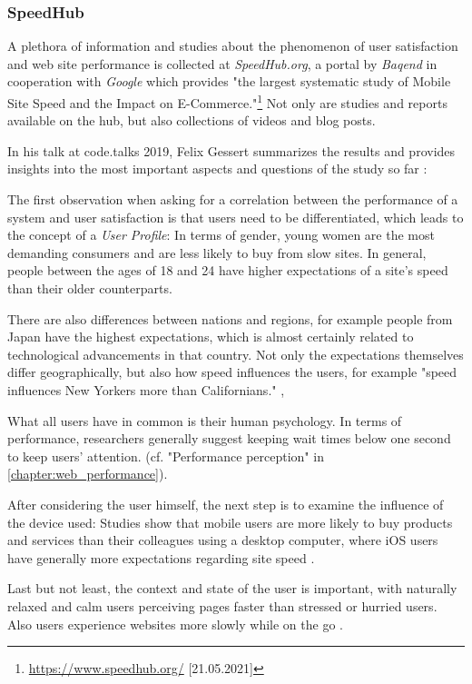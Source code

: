 \subsubsection{SpeedHub}

A plethora of information and studies about the phenomenon of user satisfaction and web site performance is collected at \textit{SpeedHub.org}, a portal by \textit{Baqend} in cooperation with \textit{Google} which provides "the largest systematic study of Mobile Site Speed and the Impact on E-Commerce."\footnote{\url{https://www.speedhub.org/} [21.05.2021]}
Not only are studies and reports available on the hub, but also collections of videos and blog posts.

In his talk at code.talks 2019, Felix Gessert summarizes the results and provides insights into the most important aspects and questions of the study so far \cite{2019Gessert}:

The first observation when asking for a correlation between the performance of a system and user satisfaction is that users need to be differentiated, which leads to the concept of a \textit{User Profile}: In terms of gender, young women are the most demanding consumers and are less likely to buy from slow sites.
In general, people between the ages of 18 and 24 have higher expectations of a site's speed than their older counterparts.

There are also differences between nations and regions, for example people from Japan have the highest expectations, which is almost certainly related to technological advancements in that country.
Not only the expectations themselves differ geographically, but also how speed influences the users, for example "speed influences New Yorkers more than Californians." \cite{2019Thinkfast}, \cite{2017Brainfood}

What all users have in common is their human psychology. 
In terms of performance, researchers generally suggest keeping wait times below one second to keep users' attention. (cf. "Performance perception" in \ref{chapter:web_performance}). 

After considering the user himself, the next step is to examine the influence of the device used: Studies show that mobile users are more likely to buy products and services than their colleagues using a desktop computer, where iOS users have generally more expectations regarding site speed \cite{2019Deviceatlas}.
 
Last but not least, the context and state of the user is important, with naturally relaxed and calm users perceiving pages faster than stressed or hurried users.
Also users experience websites more slowly while on the go \cite{2014Akamai}.
\\

